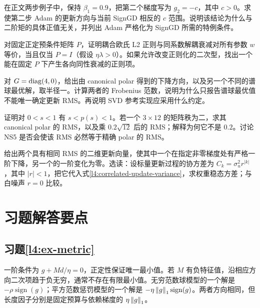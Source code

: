 \begin{exercise}
\label{l4:ex-adam}
在正文两步例子中，保持 $\beta_1=0.9$，把第二个梯度写为 $g_2=-c$，其中 $c>0$。求使第二步 Adam 的更新方向与当前 SignGD 相反的 $c$ 范围。说明该结论为什么与二阶矩的具体正值无关，并列出 Adam 严格化为 SignGD 所需的特例条件。
\end{exercise}

\begin{exercise}[解耦衰减]
\label{l4:ex-decay}
对固定正定预条件矩阵 $P$，证明耦合欧氏 L2 正则与同系数解耦衰减对所有参数 $w$ 等价，当且仅当 $P=I$（假设 $\eta\lambda>0$）。如果允许改变正则化的二次型，找出一个能在固定 $P$ 下产生各向同性衰减的正则项。
\end{exercise}

\begin{exercise}[谱球的解与秩亏]
\label{l4:ex-polar}
对 $G=\operatorname{diag}(4,0)$，给出由 canonical polar 得到的下降方向，以及另一个不同的谱球最优解，取半径一。计算两者的 Frobenius 范数，说明为什么只报告谱球最优值不能唯一确定更新 RMS。再说明 SVD 参考实现应采用什么约定。
\end{exercise}

\begin{exercise}
\label{l4:ex-ns}
证明对 $0<s<1$ 有 $s<p(s)<1$。若一个 $3\times12$ 的矩阵秩为二，求其 canonical polar 的 RMS，以及乘 $0.2\sqrt{12}$ 后的 RMS；解释为何它不是 $0.2$。讨论 NS5 是否会使该 RMS 必然等于精确 polar 的 RMS。
\end{exercise}

\begin{exercise}[更新长度不足以决定训练动力学]
\label{l4:ex-rms}
给出两个具有相同 RMS 的二维更新向量，使其中一个在指定非零梯度处有严格一阶下降，另一个的一阶变化为零。选读：设标量更新过程的协方差为 $C_k=\sigma_u^2r^{|k|}$，其中 $|r|<1$，把它代入式\eqref{l4:correlated-update-variance}，求权重稳态方差；与白噪声 $r=0$ 比较。
\end{exercise}

\section{习题解答要点}
\label{l4:solutions}

\subsection*{习题\ref{l4:ex-metric}}
一阶条件为 $g+Md/\eta=0$，正定性保证唯一最小值。若 $M$ 有负特征值，沿相应方向二次项趋于负无穷，通常不存在有限最小值。无穷范数球模型的一个解是
$-\rho\operatorname{sign}(g)$；平方范数惩罚模型的一个解是
$-\eta\left\lVert g\right\rVert_1\operatorname{sign}(g)$。两者方向相同，但长度因子分别是固定预算与依赖梯度的 $\eta\left\lVert g\right\rVert_1$。

